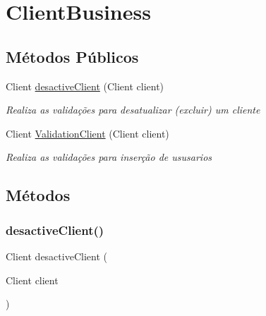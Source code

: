 \hypertarget{classBusiness_1_1ClientBusiness}{}\section{Client\+Business}
\label{classBusiness_1_1ClientBusiness}
\subsection*{Métodos Públicos}
\begin{DoxyCompactItemize}
\item 
Client \hyperlink{classBusiness_1_1ClientBusiness_afb681df27b3533da4cee4cce1eb4a548}{desactive\+Client} (Client client)
\begin{DoxyCompactList}\small\item\em Realiza as validações para desatualizar (excluir) um cliente \end{DoxyCompactList}\item 
Client \hyperlink{classBusiness_1_1ClientBusiness_a8342831feddce88564ead2ac46ea1550}{Validation\+Client} (Client client)
\begin{DoxyCompactList}\small\item\em Realiza as validações para inserção de ususarios \end{DoxyCompactList}\end{DoxyCompactItemize}


\subsection{Métodos}
\mbox{\label{classBusiness_1_1ClientBusiness_afb681df27b3533da4cee4cce1eb4a548}} 
\subsubsection{\texorpdfstring{desactive\+Client()}{desactiveClient()}}
{\footnotesize\ttfamily Client desactive\+Client (\begin{DoxyParamCaption}\item[{Client}]{client }\end{DoxyParamCaption})}



